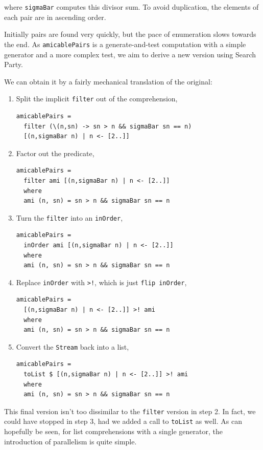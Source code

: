 \noindent where \verb|sigmaBar| computes this divisor sum. To avoid
duplication, the elements of each pair are in ascending order.

Initially pairs are found very quickly, but the pace of enumeration
slows towards the end. As \verb|amicablePairs| is a generate-and-test
computation with a simple generator and a more complex test, we aim to
derive a new version using Search Party.

We can obtain it by a fairly mechanical translation of the original:

\begin{enumerate}
  \item Split the implicit \verb|filter| out of the comprehension,
\begin{verbatim}
amicablePairs =
  filter (\(n,sn) -> sn > n && sigmaBar sn == n)
  [(n,sigmaBar n) | n <- [2..]]
\end{verbatim}

  \item Factor out the predicate,
\begin{verbatim}
amicablePairs =
  filter ami [(n,sigmaBar n) | n <- [2..]]
  where
  ami (n, sn) = sn > n && sigmaBar sn == n
\end{verbatim}

  \item Turn the \verb|filter| into an \verb|inOrder|,
\begin{verbatim}
amicablePairs =
  inOrder ami [(n,sigmaBar n) | n <- [2..]]
  where
  ami (n, sn) = sn > n && sigmaBar sn == n
\end{verbatim}

  \item Replace \verb|inOrder| with \verb|>!|, which is just
    \verb|flip inOrder|,
\begin{verbatim}
amicablePairs =
  [(n,sigmaBar n) | n <- [2..]] >! ami
  where
  ami (n, sn) = sn > n && sigmaBar sn == n
\end{verbatim}

  \item Convert the \verb|Stream| back into a list,
\begin{verbatim}
amicablePairs =
  toList $ [(n,sigmaBar n) | n <- [2..]] >! ami
  where
  ami (n, sn) = sn > n && sigmaBar sn == n
\end{verbatim}
\end{enumerate}

This final version isn't too dissimilar to the \verb|filter| version
in step 2. In fact, we could have stopped in step 3, had we added a
call to \verb|toList| as well. As can hopefully be seen, for list
comprehensions with a single generator, the introduction of
parallelism is quite simple.

